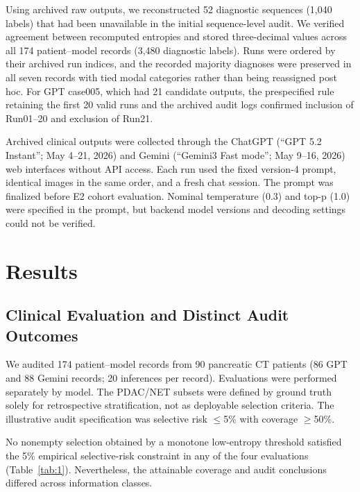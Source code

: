 \documentclass[letterpaper]{article}
\begin{document}
Using archived raw outputs, we reconstructed 52 diagnostic sequences (1,040 labels) that had been unavailable in the initial sequence-level audit. We verified agreement between recomputed entropies and stored three-decimal values across all 174 patient--model records (3,480 diagnostic labels). Runs were ordered by their archived run indices, and the recorded majority diagnoses were preserved in all seven records with tied modal categories rather than being reassigned post hoc. For GPT case005, which had 21 candidate outputs, the prespecified rule retaining the first 20 valid runs and the archived audit logs confirmed inclusion of Run01--20 and exclusion of Run21.

Archived clinical outputs were collected through the ChatGPT (“GPT 5.2 Instant”; May 4–21, 2026) and Gemini (“Gemini3 Fast mode”; May 9–16, 2026) web interfaces without API access. Each run used the fixed version-4 prompt, identical images in the same order, and a fresh chat session. The prompt was finalized before E2 cohort evaluation. Nominal temperature (0.3) and top-p (1.0) were specified in the prompt, but backend model versions and decoding settings could not be verified.

\section{Results}

\subsection{Clinical Evaluation and Distinct Audit Outcomes}

We audited 174 patient--model records from 90 pancreatic CT patients (86 GPT and 88 Gemini records; 20 inferences per record). Evaluations were performed separately by model. The PDAC/NET subsets were defined by ground truth solely for retrospective stratification, not as deployable selection criteria. The illustrative audit specification was selective risk $\leq$5\% with coverage $\geq$50\%.

No nonempty selection obtained by a monotone low-entropy threshold satisfied the 5\% empirical selective-risk constraint in any of the four evaluations (Table~\ref{tab:1}). Nevertheless, the attainable coverage and audit conclusions differed across information classes.
\end{document}
